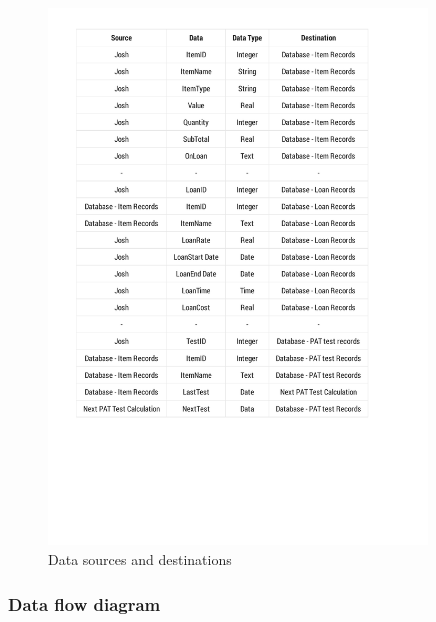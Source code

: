 \documentclass[a4paper,12pt]{report}
\begin{document}
\begin{figure}[H]
    \caption{Data sources and destinations} \label{fig: Data sources and destinations}
    \includegraphics[page=1,width=380px]{./DataS&D/Data_S&D.pdf}
\end{figure}

\subsubsection{Data flow diagram}
\end{document}
